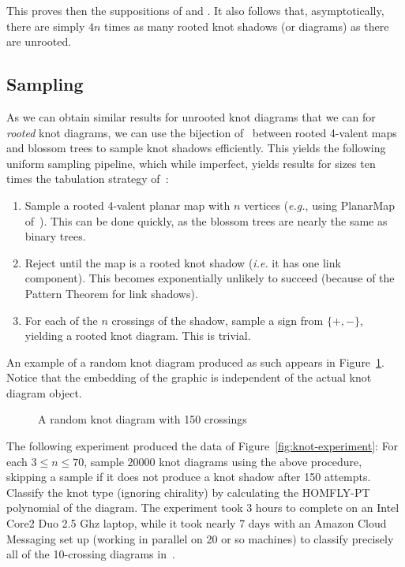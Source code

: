 \documentclass[submission%
]{dmtcs}
\begin{document}
This proves then the suppositions of
\cite{pzjschaeff2004planecurveasymp} and \cite{zuber2015mapsimsperms}.
It also follows that, asymptotically, there are simply $4n$ times as
many rooted knot shadows (or diagrams) as there are unrooted.

\subsection{Sampling}
\label{sec:sampling}

As we can obtain similar results for unrooted knot diagrams that we
can for \emph{rooted} knot diagrams, we can use the bijection
of~\cite{Schaeffer1997} between rooted 4-valent maps and blossom trees
to sample knot shadows efficiently. This yields the following uniform
sampling pipeline, which while imperfect, yields results for sizes ten
times the tabulation strategy of~\cite{CCMknotdiagrams2015}:

\begin{enumerate}
\item Sample a rooted 4-valent planar map with $n$ vertices
  (\textit{e.g.}, using PlanarMap of~\cite{SchaefferPlanarMap}). This can be
  done quickly, as the blossom trees are nearly the same as binary
  trees.
\item Reject until the map is a rooted knot shadow (\textit{i.e.} it
  has one link component). This becomes exponentially unlikely to
  succeed (because of the Pattern Theorem for link shadows).
\item For each of the $n$ crossings of the shadow, sample a sign from
  $\{+, -\}$, yielding a rooted knot diagram. This is trivial.
\end{enumerate}

An example of a random knot diagram produced as such appears in
Figure~\ref{fig:randomknot}. Notice that the embedding of the graphic
is independent of the actual knot diagram object.
\begin{figure}[htbp]
  \centering
  
  \caption{A random knot diagram with 150 crossings}
  \label{fig:randomknot}
\end{figure}

The following experiment produced the data of
Figure~\ref{fig:knot-experiment}: For each $3 \le n \le 70$, sample
$20000$ knot diagrams using the above procedure, skipping a sample if
it does not produce a knot shadow after 150 attempts. Classify the
knot type (ignoring chirality) by calculating the HOMFLY-PT polynomial
of the diagram. The experiment took 3 hours to complete on an Intel
Core2 Duo 2.5 Ghz laptop, while it took nearly 7 days with an Amazon
Cloud Messaging set up (working in parallel on 20 or so machines) to
classify precisely all of the 10-crossing diagrams
in~\cite{CCMknotdiagrams2015}.
\end{document}

